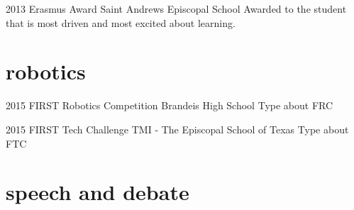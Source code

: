 \documentclass[]{friggeri-cv} %
\begin{document}
\begin{entrylist}


\entry
{2013}
{Erasmus Award}
{Saint Andrews Episcopal School}
{Awarded to the student that is most driven and most excited about learning.}


\end{entrylist}


\section{robotics}

\begin{entrylist}


\entry
{2015}
{FIRST Robotics Competition}
{Brandeis High School}
{\color{red}Type about FRC}


\entry
{2015}
{FIRST Tech Challenge}
{TMI - The Episcopal School of Texas}
{\color{red}Type about FTC}


\end{entrylist}


\section{speech and debate}
\end{document}
